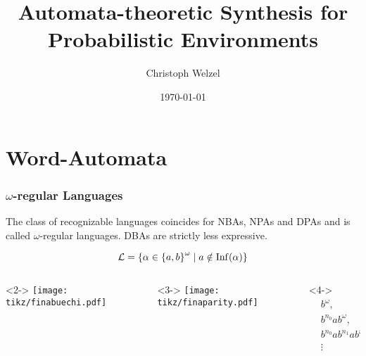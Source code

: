 \documentclass{beamer}
\title[Syn. for prob. Env.]{
  Automata-theoretic Synthesis for Probabilistic Environments}
\date{\today}
\author{Christoph Welzel}
\institute{Informatik 7, RWTH Aachen}
\begin{document}
  \acuseall

  \maketitle

  \section{Word-Automata}
  \begin{frame}
    \frametitle{$\omega$-regular Languages}
    \begin{theorem}
      The class of recognizable languages coincides for \alert<2>{\acp{NBA}},
      \alert<3>{\acp{NPA} and \acp{DPA}} and is called $\omega$-regular
      languages. \alert<4>{\acp{DBA} are strictly less expressive.}
    \end{theorem}
    \begin{overlayarea}{\textwidth}{0.5\textheight}
        \begin{equation*}
          \mathcal{L} = \left\{
            \alpha\in\left\{a,b\right\}^{\omega}\mid a\notin\operatorname{Inf}(\alpha)
          \right\}
        \end{equation*}
        \begin{columns}
          \begin{column}{0.3\textwidth}<2->
            \texttt{[image: tikz/finabuechi.pdf]}
          \end{column}
          \begin{column}{0.3\textwidth}<3->
            \texttt{[image: tikz/finaparity.pdf]}
          \end{column}
          \begin{column}{0.3\textwidth}<4->
            \begin{align*}
              &b^{\omega},\\
              &b^{n_{0}}ab^{\omega},\\
              &b^{n_{0}}ab^{n_{1}}ab^{\omega},\\
              &\vdots
            \end{align*}
          \end{column}
        \end{columns}
    \end{overlayarea}
  \end{frame}
\end{document}
